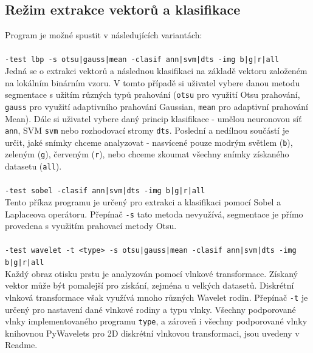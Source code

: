 \subsection{Režim extrakce vektorů a klasifikace}
Program je možné spustit v následujících variantách:\\\\
\verb=-test lbp -s otsu|gauss|mean -clasif ann|svm|dts -img b|g|r|all=\\
Jedná se o extrakci vektorů a následnou klasifikaci na základě vektoru založeném na lokálním binárním vzoru. V tomto případě si uživatel vybere danou metodu segmentace s užitím různých typů prahování (\verb=otsu= pro využití Otsu prahování, \verb=gauss= pro využití adaptivního prahování Gaussian, \verb=mean= pro adaptivní prahování Mean). Dále si uživatel vybere daný princip klasifikace - umělou neuronovou síť \verb=ann=, SVM \verb=svm= nebo rozhodovací stromy \verb=dts=. Poslední a nedílnou součástí je určit, jaké snímky chceme analyzovat - nasvícené pouze modrým světlem (\verb=b=), zeleným (\verb=g=), červeným (\verb=r=), nebo chceme zkoumat všechny snímky získaného datasetu (\verb=all=).\\\\
\verb=-test sobel -clasif ann|svm|dts -img b|g|r|all=\\
Tento příkaz programu je určený pro extrakci a klasifikaci pomocí Sobel a Laplaceova operátoru. Přepínač \verb=-s= tato metoda nevyužívá, segmentace je přímo provedena s využitím prahovací metody Otsu.\\\\
\verb=-test wavelet -t <type> -s otsu|gauss|mean -clasif ann|svm|dts -img b|g|r|all=\\
Každý obraz otisku prstu je analyzován pomocí vlnkové transformace. Získaný vektor může být pomalejší pro získání, zejména u velkých datasetů. Diskrétní vlnková transformace však využívá mnoho různých Wavelet rodin. Přepínač \verb=-t= je určený pro nastavení dané vlnkové rodiny a typu vlnky. Všechny podporované vlnky implementovaného programu \verb=type=, a zároveň i všechny podporované vlnky knihovnou PyWavelets pro 2D diskrétní vlnkovou transformaci, jsou uvedeny v Readme. 

